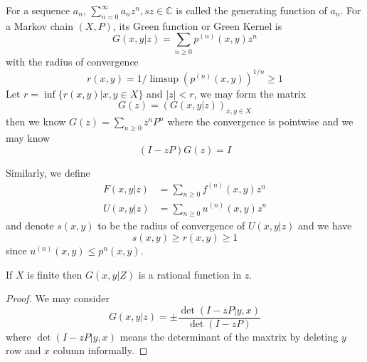 \documentclass[lang=en, color=blue, ]{elegantbook}
\newcommand{\C}{\mathbb{C}}
\begin{document}
\begin{definition}
    For a sequence $a_n$, $\sum\limits_{n=0}^{\infty} a_n z^n, sz\in \C$ is called the generating function of $a_n$. For a Markov chain $(X,P)$, its Green function or Green Kernel is
    \[G(x,y|z) = \sum_{n\geq 0}p^{(n)}(x,y)z^n\]
    with the radius of convergence
    \[
    r(x,y) = 1/\limsup (p^{(n)}(x,y))^{1/n} \geq 1
    \]
    Let $r= \inf\{r(x,y)|x,y\in X\}$ and $|z| < r$, we may form the matrix
    \[
    G(z) = (G(x,y|z))_{x,y\in X}
    \]
    then we know $G(z) = \sum_{n\geq 0}z^nP^n$ where the convergence is pointwise and we may know
    \[
    (I-zP)G(z) = I
    \]\par
    Similarly, we define
    \[
    \begin{aligned}
        F(x,y|z) &= \sum_{n\geq 0} f^{(n)}(x,y)z^n \\
        U(x,y|z) &= \sum_{n\geq 0} u^{(n)}(x,y)z^n
    \end{aligned}
    \]
    and denote $s(x,y)$ to be the radius of convergence of $U(x,y|z)$ and we have
    \[s(x,y) \geq r(x,y) \geq 1\]
    since $u^{(n)}(x,y) \leq p^n(x,y)$.
\end{definition}

\begin{theorem}
    If $X$ is finite then $G(x,y|Z)$ is a rational function in $z$.
\end{theorem}
\begin{proof}
    We may consider
    \[
    G(x,y|z) = \pm \dfrac{\det(I-zP|y,x)}{\det(I-zP)}
    \]
    where  $\det(I-zP|y,x)$ means the determinant of the maxtrix by deleting $y$ row and $x$ column informally.
\end{proof}
\end{document}
